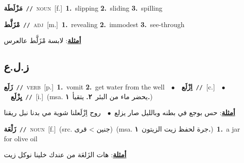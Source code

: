\documentclass[10pt,a4paper,twoside]{article} %
\begin{document}
\begin{multicols}{2}
{\setlength\topsep{0pt}\textbf{\foreignlanguage{arabic}{مَزْلَطَة}}\ {\color{gray}\texttt{//}\color{black}}\ \textsc{noun}\ [f.]\ \textbf{1.}~slipping  \textbf{2.}~sliding  \textbf{3.}~spilling\ } \vspace{2mm}

{\setlength\topsep{0pt}\textbf{\foreignlanguage{arabic}{مْزَلَّط}}\ {\color{gray}\texttt{//}\color{black}}\ \textsc{adj}\ [m.]\ \textbf{1.}~revealing  \textbf{2.}~immodest  \textbf{3.}~see-through\  \begin{flushright}\color{gray}\foreignlanguage{arabic}{\textbf{\underline{\foreignlanguage{arabic}{أمثلة}}}: لابسة مْزَلَّط عالعرس}\end{flushright}\color{black}} \vspace{2mm}

\vspace{-3mm}
\subsection*{\color{blue}\foreignlanguage{arabic}{ز.ل.ع}\color{blue}{}} 

{\setlength\topsep{0pt}\textbf{\foreignlanguage{arabic}{زَلَع}}\ {\color{gray}\texttt{//}\color{black}}\ \textsc{verb}\ [p.]\ \textbf{1.}~vomit  \textbf{2.}~get water from the well\ \ $\bullet$\ \ \setlength\topsep{0pt}\textbf{\foreignlanguage{arabic}{اِزْلَع}}\ {\color{gray}\texttt{//}\color{black}}\ [c.]\ \ $\bullet$\ \ \setlength\topsep{0pt}\textbf{\foreignlanguage{arabic}{يِزْلَع}}\ {\color{gray}\texttt{//}\color{black}}\ [i.]\ \color{gray}(msa. \foreignlanguage{arabic}{يحضر ماء من البئر}~\foreignlanguage{arabic}{\textbf{٢.}}  \foreignlanguage{arabic}{يتقيأ}~\foreignlanguage{arabic}{\textbf{١.}})\color{black}\  \begin{flushright}\color{gray}\foreignlanguage{arabic}{\textbf{\underline{\foreignlanguage{arabic}{أمثلة}}}: حس بوجع في بطنه وبالليل صار يزلع\ $\bullet$\ \  روح اِزْلَعلنا شوية مي بدنا نبل ريقنا}\end{flushright}\color{black}} \vspace{2mm}

{\setlength\topsep{0pt}\textbf{\foreignlanguage{arabic}{زَلْعَة}}\ {\color{gray}\texttt{//}\color{black}}\ \textsc{noun}\ [f.]\ (src. \color{gray}\foreignlanguage{arabic}{جنين > قرى}\color{black})\ \color{gray}(msa. \foreignlanguage{arabic}{جرة لحفظ زيت الزيتون}~\foreignlanguage{arabic}{\textbf{١.}})\color{black}\ \textbf{1.}~a jar for olive oil\  \begin{flushright}\color{gray}\foreignlanguage{arabic}{\textbf{\underline{\foreignlanguage{arabic}{أمثلة}}}: هات الزَلعَة من عندك خلينا نوكل زيت}\end{flushright}\color{black}} \vspace{2mm}


\end{multicols}
\end{document}
